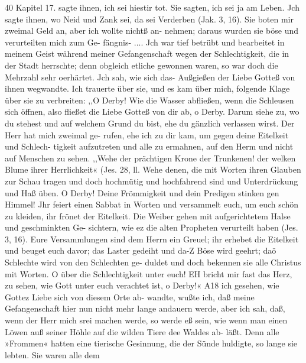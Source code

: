 
40 Kapitel 17.
sagte ihnen, ich sei hiestir tot. Sie sagten, ich sei ja am Leben.
Jch sagte ihnen, wo Neid und Zank sei, da sei Verderben (Jak. 3, 16).
Sie boten mir zweimal Geld an, aber ich wollte nichtß an-
nehmen; daraus wurden sie böse und verurteilten mich zum Ge-
fängnis- ....
Jch war tief betrübt und bearbeitet in meinem Geist während
meiner Gefangenschaft wegen der Schlechtigkeit, die in der Stadt
herrschte; denn obgleich etliche gewonnen waren, so war doch die
Mehrzahl sehr oerhärtet. Jch sah, wie sich das- Außgießen der
Liebe Gotteß von ihnen wegwandte. Ich trauerte über sie, und
es kam über mich, folgende Klage über sie zu verbreiten:
,,O Derby! Wie die Wasser abfließen, wenn die Schleusen
sich öffnen, also fließet die Liebe Gotteß von dir ab, o Derby.
Darum siehe zu, wo du stehest und auf welchem Grund du bist,
ehe du gänzlich verlassen wirst. Der Herr hat mich zweimal ge-
rufen, ehe ich zu dir kam, um gegen deine Eitelkeit und Schlech-
tigkeit aufzutreten und alle zu ermahnen, auf den Herm und
nicht auf Menschen zu sehen. ,,Wehe der prächtigen Krone der
Trunkenen! der welken Blume ihrer Herrlichkeit« (Jes. 28, ll.
Wehe denen, die mit Worten ihren Glauben zur Schau tragen und
doch hochmütig und hochfahrend sind und Unterdrückung und Haß
üben. O Derby! Deine Frömmigkeit und dein Predigen stinken
gen Himmel! Jhr feiert einen Sabbat in Worten und versammelt
euch, um euch schön zu kleiden, ihr frönet der Eitelkeit. Die
Weiber gehen mit aufgerichtetem Halse und geschminkten Ge-
sichtern, wie ez die alten Propheten verurteilt haben (Jes. 3, 16).
Eure Versammlungen sind dem Herrn ein Greuel; ihr erhebet
die Eitelkeit und beuget euch davor; das Laster gedeiht und da-Z
Böse wird geehrt; daö Schlechte wird von den Schlechten ge-
duldet und doch bekennen sie alle Christus mit Worten. O über
die Schlechtigkeit unter euch! EH bricht mir fast das Herz, zu
sehen, wie Gott unter euch verachtet ist, o Derby!«
A18 ich gesehen, wie Gottez Liebe sich von diesem Orte ab-
wandte, wußte ich, daß meine Gefangenschaft hier nun nicht mehr
lange andauern werde, aber ich sah, daß, wenn der Herr mich
srei machen werde, so werde eß sein, wie wenn man einen
Löwen auß seiner Höhle auf die wilden Tiere dee Waldes ab-
läßt. Denn alle »Frommen« hatten eine tierische Gesinnung, die
der Sünde huldigte, so lange sie lebten. Sie waren alle dem


